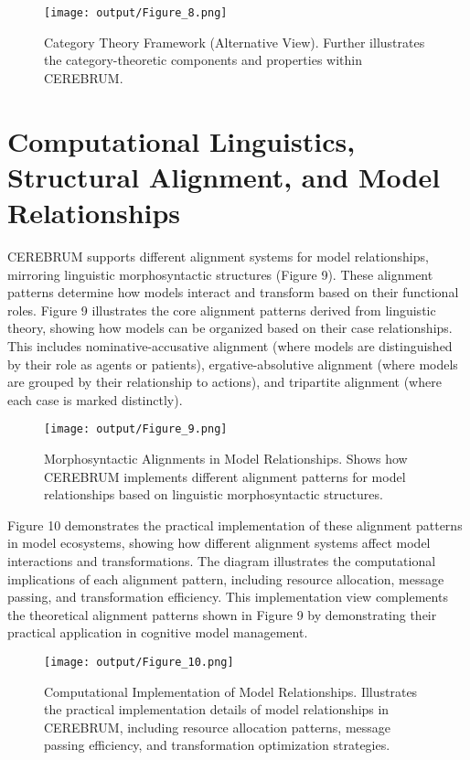 \begin{figure}
\centering
\texttt{[image: output/Figure\_8.png]}
\caption{Category Theory Framework (Alternative View). Further
illustrates the category-theoretic components and properties within
CEREBRUM.}
\end{figure}

\hypertarget{computational-linguistics-structural-alignment-and-model-relationships}{%
\section{Computational Linguistics, Structural Alignment, and Model
Relationships}\label{computational-linguistics-structural-alignment-and-model-relationships}}

CEREBRUM supports different alignment systems for model relationships,
mirroring linguistic morphosyntactic structures (Figure 9). These
alignment patterns determine how models interact and transform based on
their functional roles. Figure 9 illustrates the core alignment patterns
derived from linguistic theory, showing how models can be organized
based on their case relationships. This includes nominative-accusative
alignment (where models are distinguished by their role as agents or
patients), ergative-absolutive alignment (where models are grouped by
their relationship to actions), and tripartite alignment (where each
case is marked distinctly).

\begin{figure}
\centering
\texttt{[image: output/Figure\_9.png]}
\caption{Morphosyntactic Alignments in Model Relationships. Shows how
CEREBRUM implements different alignment patterns for model relationships
based on linguistic morphosyntactic structures.}
\end{figure}

Figure 10 demonstrates the practical implementation of these alignment
patterns in model ecosystems, showing how different alignment systems
affect model interactions and transformations. The diagram illustrates
the computational implications of each alignment pattern, including
resource allocation, message passing, and transformation efficiency.
This implementation view complements the theoretical alignment patterns
shown in Figure 9 by demonstrating their practical application in
cognitive model management.

\begin{figure}
\centering
\texttt{[image: output/Figure\_10.png]}
\caption{Computational Implementation of Model Relationships.
Illustrates the practical implementation details of model relationships
in CEREBRUM, including resource allocation patterns, message passing
efficiency, and transformation optimization strategies.}
\end{figure}

